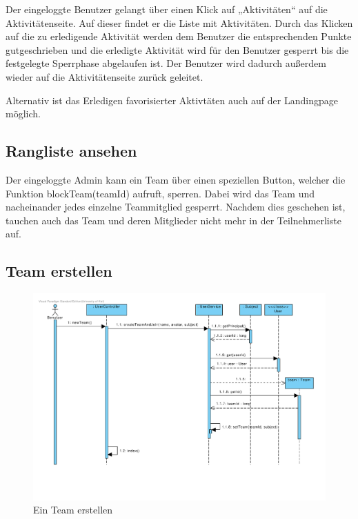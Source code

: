 Der eingeloggte Benutzer gelangt über einen Klick auf „Aktivitäten“
auf die Aktivitätenseite. Auf dieser findet er die Liste mit
Aktivitäten. Durch das Klicken auf die zu erledigende Aktivität werden
dem Benutzer die entsprechenden Punkte gutgeschrieben und die
erledigte Aktivität wird für den Benutzer gesperrt bis die festgelegte
Sperrphase abgelaufen ist. Der Benutzer wird dadurch außerdem wieder auf die
Aktivitätenseite zurück geleitet.

Alternativ ist das Erledigen favorisierter Aktivtäten auch auf der
Landingpage möglich.

\subsection{Rangliste ansehen}


Der eingeloggte Admin kann ein Team über einen speziellen Button, welcher die Funktion blockTeam(teamId) aufruft, sperren. Dabei wird das Team und nacheinander jedes einzelne Teammitglied gesperrt. Nachdem dies geschehen ist, tauchen auch das Team und deren Mitglieder nicht mehr in der Teilnehmerliste auf.\\

\subsection{Team erstellen}

\begin{figure}[H]
  \centering
  \includegraphics[width=16cm, trim= 1cm 3cm 1cm 1cm, clip, angle=90]{gfx/team_erstellen}
  \caption{Ein Team erstellen}
\end{figure}


